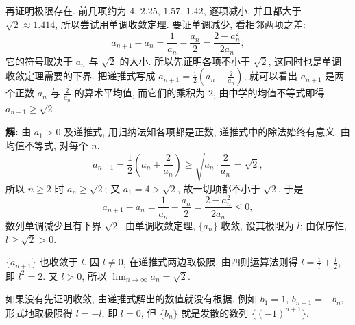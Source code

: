 \documentclass[UTF8,openany]{ctexbook}
\theoremstyle{chinesetextbook}
\newenvironment{cnsolution}{\par\indent\textbf{解:} \ignorespaces}{\par}
\begin{document}
再证明极限存在. 前几项约为 $4$, $2.25$, $1.57$, $1.42$, 逐项减小, 并且都大于 $\sqrt2\approx1.414$, 所以尝试用单调收敛定理. 要证单调减少, 看相邻两项之差:
\[
a_{n+1}-a_n=\frac1{a_n}-\frac{a_n}2=\frac{2-a_n^2}{2a_n},
\]
它的符号取决于 $a_n$ 与 $\sqrt2$ 的大小. 所以先证明各项不小于 $\sqrt2$, 这同时也是单调收敛定理需要的下界. 把递推式写成 $\displaystyle a_{n+1}=\frac12\left(a_n+\frac2{a_n}\right)$, 就可以看出 $a_{n+1}$ 是两个正数 $a_n$ 与 $\displaystyle\frac2{a_n}$ 的算术平均值, 而它们的乘积为 $2$, 由中学的均值不等式即得 $a_{n+1}\ge\sqrt2$.
\begin{cnsolution}
由 $a_1>0$ 及递推式, 用归纳法知各项都是正数, 递推式中的除法始终有意义. 由均值不等式, 对每个 $n$,
\[
a_{n+1}=\frac12\left(a_n+\frac2{a_n}\right)\ge\sqrt{a_n\cdot\frac2{a_n}}=\sqrt2,
\]
所以 $n\ge2$ 时 $a_n\ge\sqrt2$; 又 $a_1=4>\sqrt2$, 故一切项都不小于 $\sqrt2$. 于是
\[
a_{n+1}-a_n=\frac1{a_n}-\frac{a_n}2=\frac{2-a_n^2}{2a_n}\le0,
\]
数列单调减少且有下界 $\sqrt2$. 由单调收敛定理, $\{a_n\}$ 收敛, 设其极限为 $l$; 由保序性, $l\ge\sqrt2>0$.

$\{a_{n+1}\}$ 也收敛于 $l$. 因 $l\ne0$, 在递推式两边取极限, 由四则运算法则得 $\displaystyle l=\frac1l+\frac l2$, 即 $l^2=2$. 又 $l>0$, 所以 $\displaystyle\lim_{n\to\infty}a_n=\sqrt2$.
\end{cnsolution}
如果没有先证明收敛, 由递推式解出的数值就没有根据. 例如 $b_1=1$, $b_{n+1}=-b_n$, 形式地取极限得 $l=-l$, 即 $l=0$, 但 $\{b_n\}$ 就是发散的数列 $\{(-1)^{n+1}\}$.
\end{document}
